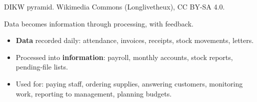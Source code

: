 {
{\color{sub}\scriptsize\centering DIKW pyramid. Wikimedia Commons (Longlivetheux),
CC BY-SA 4.0.\par}
{\color{sub}\scriptsize Data becomes information through processing, with feedback.}
\begin{itemize}
  \item \textbf{Data} recorded daily: attendance, invoices, receipts, stock movements,
    letters.
  \item Processed into \textbf{information}: payroll, monthly accounts, stock reports,
    pending-file lists.
  \item Used for: paying staff, ordering supplies, answering customers, monitoring work,
    reporting to management, planning budgets.
\end{itemize}}

\vspace{2pt}


